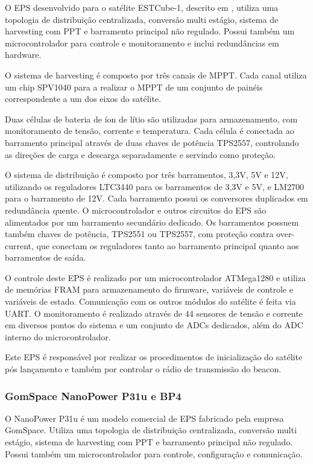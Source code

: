 O \gls{EPS} desenvolvido para o satélite ESTCube-1, descrito em \textcite{estcube-eps}, utiliza uma topologia de distribuição centralizada, conversão multi estágio, sistema de harvesting com \gls{PPT} e barramento principal não regulado.
Possui também um microcontrolador para controle e monitoramento e inclui redundâncias em hardware.

O sistema de harvesting é composto por três canais de \gls{MPPT}. Cada canal utiliza um chip SPV1040 para a realizar o \gls{MPPT} de um conjunto de painéis correspondente a um dos eixos do satélite.

Duas células de bateria de íon de lítio são utilizadas para armazenamento, com monitoramento de tensão, corrente e temperatura. Cada célula é conectada ao barramento principal através de duas chaves de potência TPS2557, controlando as direções de carga e descarga separadamente e servindo como proteção.

O sistema de distribuição é composto por três barramentos, 3,3V, 5V e 12V, utilizando os reguladores LTC3440 para os barramentos de 3,3V e 5V, e LM2700 para o barramento de 12V.
Cada barramento possui os conversores duplicados em redundância quente.
O microcontrolador e outros circuitos do \gls{EPS} são alimentados por um barramento secundário dedicado.
Os barramentos possuem também chaves de potência, TPS2551 ou TPS2557, com proteção contra over-current, que conectam os reguladores tanto ao barramento principal quanto aos barramentos de saída.

O controle deste \gls{EPS} é realizado por um microcontrolador ATMega1280 e utiliza de memórias FRAM para armazenamento do firmware, variáveis de controle e variáveis de estado.
Comunicação com os outros módulos do satélite é feita via \gls{UART}.
O monitoramento é realizado através de 44 sensores de tensão e corrente em diversos pontos do sistema e um conjunto de \gls{ADC}s dedicados, além do \gls{ADC} interno do microcontrolador.

Este \gls{EPS} é responsável por realizar os procedimentos de inicialização do satélite pós lançamento e também por controlar o rádio de transmissão do beacon.




\subsubsection{GomSpace NanoPower P31u e BP4}

O NanoPower P31u \cite{p31u-datasheet} é um modelo comercial de \gls{EPS} fabricado pela empresa GomSpace. Utiliza uma topologia de distribuição centralizada, conversão multi estágio, sistema de harvesting com \gls{PPT} e barramento principal não regulado. Possui também um microcontrolador para controle, configuração e comunicação.

